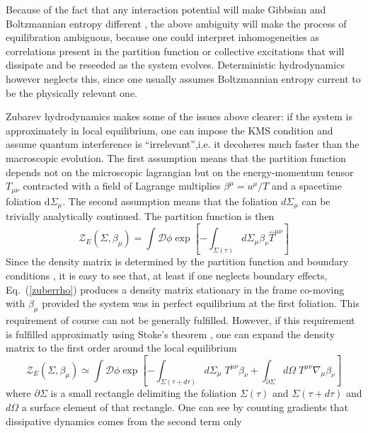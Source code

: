 \documentclass[12pt,onecolumn,showpacs,amssymb,aps,nofootinbib,floatfix]{revtex4-2}
\renewcommand{\eqref}[1]{Eq.~(\ref{#1})}
\begin{document}
	
	Because of the fact that any interaction potential will make Gibbsian and Boltzmannian entropy different \cite{jaynes}, the above ambiguity will make the process of equilibration ambiguous, because one could interpret inhomogeneities as correlations present in the partition function or collective excitations that will dissipate and be reseeded as the system evolves.   Deterministic hydrodynamics however neglects this, since one usually assumes Boltzmannian entropy current to be the physically relevant one.
	
	Zubarev hydrodynamics makes some of the issues above clearer: 
	if the system is approximately in local equilibrium, one can 
	\cite{crooks,zubbec} \color{black} impose the KMS condition and assume quantum interference is ``irrelevant'',i.e. it decoheres much faster than the macroscopic evolution.   The first assumption means that the partition function depends not on the microscopic lagrangian but on the energy-momentum tensor $T_{\mu \nu}$ contracted with a field of Lagrange multiplies $\beta^\mu = u^\mu/T$ and a spacetime foliation d$\Sigma_\mu$.
        The second assumption means that the foliation $d\Sigma_\mu$ can be trivially analytically continued.   The partition function is then
        	\begin{equation}
		\label{zuberrho}
		\mathcal{Z}_E(\Sigma,\beta_\mu) = \int \mathcal{D}\phi \exp \left[ - \int_{\Sigma(\tau)} d \Sigma_\mu \beta_\nu \hat{T}^{\mu \nu}    \right]\end{equation}
Since the density matrix is determined by the partition function and boundary conditions \cite{nishioka}, it is easy to see that, at least if one neglects boundary effects, \eqref{zuberrho} produces a density matrix stationary in the frame co-moving with $\beta_\mu$ provided the system was in perfect equilibrium at the first foliation.  This requirement of course can not be generally fulfilled.
      However, if this requirement is fulfilled approximatly using Stoke's theorem \cite{zubbec}, one can expand the density matrix to the first order around the local equilibrium \cite{zubbec}
        \begin{equation}
          	\mathcal{Z}_E(\Sigma,\beta_\mu)
		\simeq \int \mathcal{D}\phi  \exp\left[ - \int_{\Sigma(\tau+d\tau)}  d \Sigma_\mu \;  T^{\mu\nu}
		\beta_\nu + \int_{\partial\Sigma} d\Omega \;  T^{\mu\nu}
		\nabla_\mu \beta_\nu   \right]
		\label{zuberrho2}
	\end{equation}
	where $\partial\Sigma$ is a small rectangle delimiting the foliation $\Sigma(\tau)$ and $\Sigma(\tau+d\tau)$ and $d\Omega$ a surface element of that rectangle. \color{black}One can see by counting gradients that dissipative dynamics comes from the second term only \cite{zubbec}\color{black}
\end{document}
